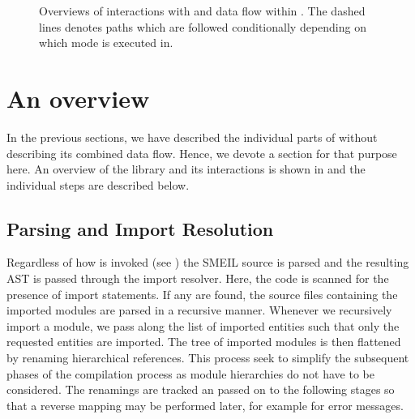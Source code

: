 \begin{figure}
{
  }
  \caption{Overviews of interactions with and data flow within \libsme{}. The
    dashed lines denotes paths which are followed conditionally depending on
    which mode \libsme{} is executed in.}
  \label{fig:overview}
\end{figure}

\section{An overview}
\label{sec:overview}
In the previous sections, we have described the individual parts of \libsme{}
without describing its combined data flow. Hence, we devote a section for that
purpose here. An overview of the \libsme{} library and its interactions is shown
in  and the individual steps are described below.

\subsection{Parsing and Import Resolution} Regardless of how \libsme{} is
invoked (see ) the SMEIL source is parsed and the resulting AST
is passed through the import resolver. Here, the code is scanned for the
presence of import statements. If any are found, the source files containing the
imported modules are parsed in a recursive manner. Whenever we recursively
import a module, we pass along the list of imported entities such that only the
requested entities are imported. The tree of imported modules is then flattened
by renaming hierarchical references. This process seek to simplify the
subsequent phases of the compilation process as module hierarchies do not have
to be considered. The renamings are tracked an passed on to the following stages
so that a reverse mapping may be performed later, for example for error
messages.

